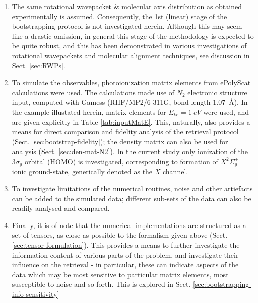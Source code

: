 \begin{enumerate}
\item The same rotational wavepacket \& molecular axis distribution as obtained experimentally is assumed. Consequently, the 1st (linear) stage of the bootstrapping protocol is not investigated herein. Although this may seem like a drastic omission, in general this stage of the methodology is expected to be quite robust, and this has been demonstrated in various investigations of rotational wavepackets and molecular alignment techniques, see discussion in Sect. \ref{sec:RWPs}.
\item To simulate the observables, photoionization matrix elements from ePolyScat \cite{Lucchese1986, Gianturco1994, Natalense1999, luccheseEPolyScatUserManual} calculations were used. The calculations made use of $N_2$ electronic structure input, computed with Gamess \cite{gamess, Gordon} (RHF/MP2/6-311G, bond length $1.07$~\AA). In the example illustated herein, matrix elements for $E_{ke}=1~eV$ were used, and are given explicitly in Table \ref{tab:inputMatE}. This, naturally, also provides a means for direct comparison and fidelity analysis of the retrieval protocol (Sect. \ref{sec:bootstrap-fidelity}); the density matrix can also be used for analysis (Sect. \ref{sec:den-mat-N2}). In the current study only ionization of the $3\sigma_g$ orbital (HOMO) is investigated, corresponding to formation of  $X^2\Sigma_{g}^{+}$ ionic ground-state, generically denoted as the $X$ channel. 
\item To investigate limitations of the numerical routines, noise and other artiefacts can be added to the simulated data; different sub-sets of the data can also be readily analysed and compared.
\item Finally, it is of note that the numerical implementations are structured as a set of tensors, as close as possible to the formalism given above (Sect. \ref{sec:tensor-formulation}). This provides a means to further investigate the information content of various parts of the problem, and investigate their influence on the retrieval - in particular, these can indicate aspects of the data which may be most sensitive to particular matrix elements, most susceptible to noise and so forth. This is explored in Sect. \ref{sec:bootstrapping-info-sensitivity}
\end{enumerate}


